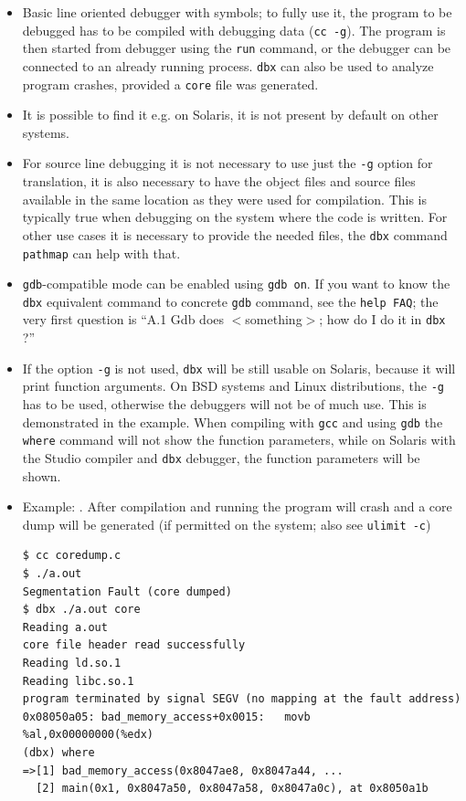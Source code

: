 \begin{itemize}
\item Basic line oriented debugger with symbols; to fully use it, the program to
be debugged has to be compiled with debugging data (\texttt{cc -g}). The program
is then started from debugger using the \texttt{run} command, or the debugger
can be connected to an already running process. \texttt{dbx} can also be used to
analyze program crashes, provided a \texttt{core} file was generated.
\item It is possible to find it e.g. on Solaris, it is not present by default
on other systems.
\item For source line debugging it is not necessary to use just the \texttt{-g}
option for translation, it is also necessary to have the object files and source
files available in the same location as they were used for compilation.
This is typically true when debugging on the system where the code is written.
For other use cases it is necessary to provide the needed files, the
\texttt{dbx} command \texttt{pathmap} can help with that.
\item \texttt{gdb}-compatible mode can be enabled using \texttt{gdb on}.
If you want to know the \texttt{dbx} equivalent command to concrete
\texttt{gdb} command, see the \texttt{help FAQ}; the very first question is
``A.1  Gdb does $<$something$>$; how do I do it in \texttt{dbx} ?''
\item If the option \texttt{-g} is not used, \texttt{dbx} will be still usable
on Solaris, because it will print function arguments. On BSD systems and Linux
distributions, the \texttt{-g} has to be used, otherwise the debuggers will not
be of much use. This is demonstrated in the  example.
When compiling with \texttt{gcc} and using \texttt{gdb} the \texttt{where}
command will not show the function parameters, while on Solaris with the Studio
compiler and \texttt{dbx} debugger, the function parameters will be shown.
\item Example: . After compilation and running the
program will crash and a core dump will be generated (if permitted on the system;
also see \texttt{ulimit -c})

\begin{verbatim}
$ cc coredump.c
$ ./a.out
Segmentation Fault (core dumped)
$ dbx ./a.out core
Reading a.out
core file header read successfully
Reading ld.so.1
Reading libc.so.1
program terminated by signal SEGV (no mapping at the fault address)
0x08050a05: bad_memory_access+0x0015:   movb     %al,0x00000000(%edx)
(dbx) where                                                                  
=>[1] bad_memory_access(0x8047ae8, 0x8047a44, ...
  [2] main(0x1, 0x8047a50, 0x8047a58, 0x8047a0c), at 0x8050a1b 
\end{verbatim}


\end{itemize}
